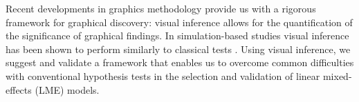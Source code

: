 \documentclass[12pt]{article} %
\newcommand{\alnote}[1]{\todo[inline,color=green!40]{#1}} %
\begin{document}
Recent developments in graphics methodology provide us with a rigorous framework for graphical discovery: visual inference  \citep{Buja:2009hp}  allows for the quantification of the significance of graphical findings. In simulation-based studies visual inference has been shown to perform similarly to classical tests  \citep{mahbub:2013}. Using visual inference, we suggest and validate a framework
 that enables us 
 to overcome common difficulties  with conventional hypothesis tests 
 in the selection and validation of linear mixed-effects (LME) models. 




\end{document}
